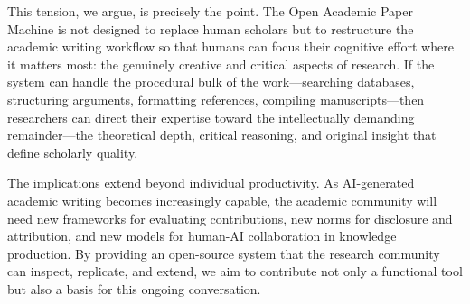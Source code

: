 \documentclass{article}
\begin{document}
This tension, we argue, is precisely the point. The Open Academic Paper Machine is not designed to replace human scholars but to restructure the academic writing workflow so that humans can focus their cognitive effort where it matters most: the genuinely creative and critical aspects of research. If the system can handle the procedural bulk of the work---searching databases, structuring arguments, formatting references, compiling manuscripts---then researchers can direct their expertise toward the intellectually demanding remainder---the theoretical depth, critical reasoning, and original insight that define scholarly quality.

The implications extend beyond individual productivity. As AI-generated academic writing becomes increasingly capable, the academic community will need new frameworks for evaluating contributions, new norms for disclosure and attribution, and new models for human-AI collaboration in knowledge production. By providing an open-source system that the research community can inspect, replicate, and extend, we aim to contribute not only a functional tool but also a basis for this ongoing conversation.


\end{document}

